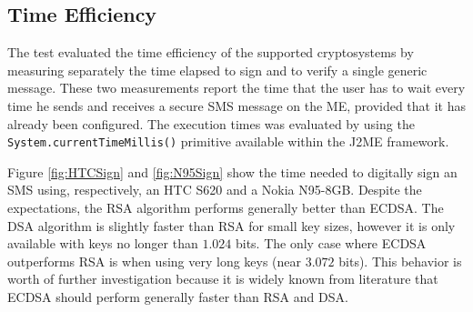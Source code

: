 \documentclass[authoryear]{elsarticle}
\begin{document}
\subsection{Time Efficiency}
The test evaluated the time efficiency of the supported cryptosystems by measuring separately the time elapsed to sign and to verify a single generic message. These two measurements report the time that the user has to wait every time he sends and receives a secure SMS message on the ME, provided that it has already been configured. The execution times was evaluated by using the {\tt System.currentTimeMillis()} primitive available within the J2ME framework.







Figure \ref{fig:HTCSign} and \ref{fig:N95Sign} show the time needed to digitally sign an SMS using, respectively, an HTC S620 and a Nokia N95-8GB. Despite the expectations, the RSA algorithm performs generally better than ECDSA. The DSA algorithm is slightly faster than RSA for small key sizes, however it is only available with keys no longer than $1.024$ bits. The only case where ECDSA outperforms RSA is when using very long keys (near $3.072$ bits). This behavior is worth of further investigation because it is widely known from literature that ECDSA should perform generally faster than RSA and DSA.
\end{document}
